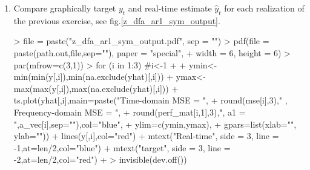 \documentclass[a4paper]{book}
\begin{document}
\begin{enumerate}
\item Compare graphically target $y_t$ and real-time estimate $\hat{y}_t$ for each realization of the previous exercise, see fig.\ref{z_dfa_ar1_sym_output}.
\begin{Schunk}
\begin{Sinput}
> file = paste("z_dfa_ar1_sym_output.pdf", sep = "")
> pdf(file = paste(path.out,file,sep=""), paper = "special", 
+     width = 6, height = 6)
> par(mfrow=c(3,1))
> for (i in 1:3)   #i<-1
+ {
+   ymin<-min(min(y[,i]),min(na.exclude(yhat)[,i]))
+   ymax<-max(max(y[,i]),max(na.exclude(yhat)[,i]))
+   ts.plot(yhat[,i],main=paste("Time-domain MSE = ",
+   round(mse[i],3)," , Frequency-domain MSE = ",
+   round(perf_mat[i,1],3),", a1 = ",a_vec[i],sep=""),col="blue",
+         ylim=c(ymin,ymax),
+   gpars=list(xlab="", ylab=""))
+   lines(y[,i],col="red")
+   mtext("Real-time", side = 3, line = -1,at=len/2,col="blue")
+   mtext("target", side = 3, line = -2,at=len/2,col="red")
+ }
> invisible(dev.off())
\end{Sinput}
\end{Schunk}



\end{enumerate}
\end{document}
